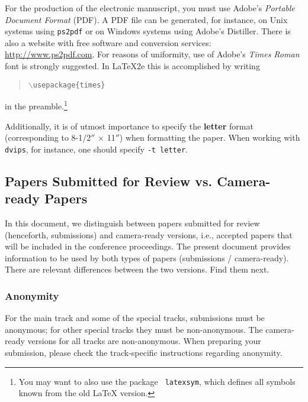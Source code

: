 \documentclass{article}
\begin{document}
For the production of the electronic manuscript, you must use Adobe's
{\em Portable Document Format} (PDF). A PDF file can be generated, for
instance, on Unix systems using {\tt ps2pdf} or on Windows systems
using Adobe's Distiller. There is also a website with free software
and conversion services: \url{http://www.ps2pdf.com}. For reasons of
uniformity, use of Adobe's {\em Times Roman} font is strongly suggested.
In \LaTeX2e{} this is accomplished by writing
\begin{quote}
    \mbox{\tt $\backslash$usepackage\{times\}}
\end{quote}
in the preamble.\footnote{You may want to also use the package {\tt
            latexsym}, which defines all symbols known from the old \LaTeX{}
    version.}

Additionally, it is of utmost importance to specify the {\bf
        letter} format (corresponding to 8-1/2$''$ $\times$ 11$''$) when
formatting the paper. When working with {\tt dvips}, for instance, one
should specify {\tt -t letter}.

\subsection{Papers Submitted for Review vs. Camera-ready Papers}
In this document, we distinguish between papers submitted for review (henceforth, submissions) and camera-ready versions, i.e., accepted papers that will be included in the conference proceedings. The present document provides information to be used by both types of papers (submissions / camera-ready). There are relevant differences between the two versions. Find them next.

\subsubsection{Anonymity}
For the main track and some of the special tracks, submissions must be anonymous; for other special tracks they must be non-anonymous. The camera-ready versions for all tracks are non-anonymous. When preparing your submission, please check the track-specific instructions regarding anonymity.
\end{document}
